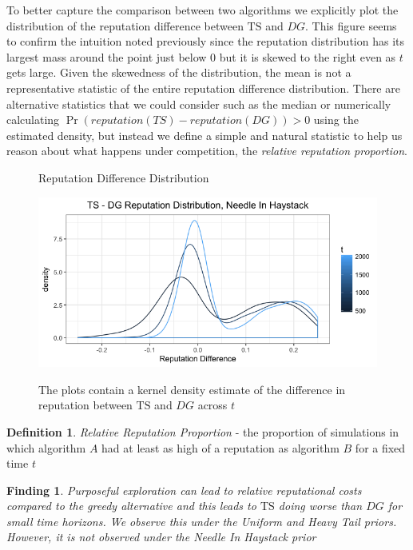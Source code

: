 \documentclass[letterpaper]{article}
\theoremstyle{definition}
\newtheorem{definition}{Definition}
\newtheorem{finding}{Finding}
\newcommand{\TS}{\mathrm{TS}}
\begin{document}
To better capture the comparison between two algorithms we explicitly plot the distribution of the reputation difference between $\TS$ and $DG$. This figure seems to confirm the intuition noted previously since the reputation distribution has its largest mass around the point just below 0 but it is skewed to the right even as $t$ gets large. Given the skewedness of the distribution, the mean is not a representative statistic of the entire reputation difference distribution. There are alternative statistics that we could consider such as the median or numerically calculating $\Pr(reputation(TS) - reputation(DG)) > 0$ using the estimated density, but instead we define a simple and natural statistic to help us reason about what happens under competition, the \textit{relative reputation proportion}.

\begin{figure}[H]
\caption{Reputation Difference Distribution}
\includegraphics[scale=0.35]{figures/ts_dg_rep_diff_nih}
\label{ts_dg_rep_diff_nih}
\caption*{\tiny{The plots contain a kernel density estimate of the difference in reputation between $\TS$ and $DG$ across $t$}}
\end{figure}

\begin{definition}
\textit{Relative Reputation Proportion} - the proportion of simulations in which algorithm $A$ had at least as high of a reputation as algorithm $B$ for a fixed time $t$
\end{definition}


\begin{finding}
\textit{Purposeful exploration can lead to relative reputational costs compared to the greedy alternative and this leads to $\TS$ doing worse than $DG$ for small time horizons. We observe this under the Uniform and Heavy Tail priors. However, it is not observed under the Needle In Haystack prior}
\end{finding}
\end{document}
